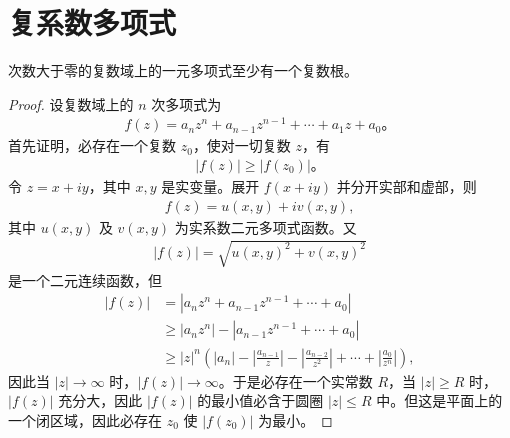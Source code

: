 \documentclass[../../main.tex]{subfiles}%
\begin{document}
\section{复系数多项式}

\begin{theorem}[代数基本定理]\label{theorem:代数基本定理}
次数大于零的复数域上的一元多项式至少有一个复数根。
\end{theorem}
\begin{proof}
设复数域上的 $n$ 次多项式为
\begin{align}
f(z) = a_n z^n + a_{n-1} z^{n-1} + \cdots + a_1 z + a_0。 \label{theorem5.14-5.6.1}
\end{align}
首先证明，必存在一个复数 $z_0$，使对一切复数 $z$，有
\begin{align*}
|f(z)| \geqslant  |f(z_0)|。
\end{align*}
令 $z = x + iy$，其中 $x, y$ 是实变量。展开 $f(x + iy)$ 并分开实部和虚部，则
\begin{align*}
f(z) = u(x, y) + iv(x, y),
\end{align*}
其中 $u(x, y)$ 及 $v(x, y)$ 为实系数二元多项式函数。又
\begin{align*}
|f(z)| = \sqrt{u(x, y)^2 + v(x, y)^2}
\end{align*}
是一个二元连续函数，但
\begin{align*}
|f(z)| &= |a_n z^n + a_{n-1} z^{n-1} + \cdots + a_0| \\
&\geqslant  |a_n z^n| - |a_{n-1} z^{n-1} + \cdots + a_0| \\
&\geqslant  |z|^n \left( |a_n| - \left| \frac{a_{n-1}}{z} \right| - \left| \frac{a_{n-2}}{z^2} \right| + \cdots + \left| \frac{a_0}{z^n} \right| \right),
\end{align*}
因此当 $|z| \to \infty$ 时，$|f(z)| \to \infty$。于是必存在一个实常数 $R$，当 $|z| \geqslant  R$ 时，$|f(z)|$ 充分大，因此 $|f(z)|$ 的最小值必含于圆圈 $|z| \leqslant  R$ 中。但这是平面上的一个闭区域，因此必存在 $z_0$ 使 $|f(z_0)|$ 为最小。


\end{proof}
\end{document}
